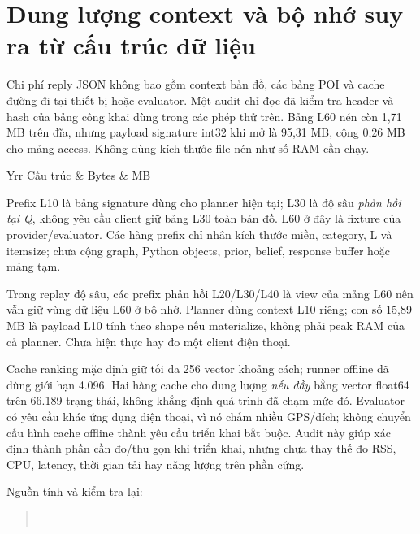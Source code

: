 \section{Dung lượng context và bộ nhớ suy ra từ cấu trúc dữ liệu}
\label{sec:current-resource-footprint}


Chi phí reply JSON không bao gồm context bản đồ, các bảng POI và cache đường
đi tại thiết bị hoặc evaluator. Một audit chỉ đọc đã kiểm tra header và hash
của bảng công khai dùng trong các phép thử trên. Bảng L60 nén còn 1,71 MB
trên đĩa, nhưng payload signature int32 khi mở là 95,31 MB, cộng 0,26 MB
cho mảng access. Không dùng kích thước file nén như số RAM cần chạy.

\begin{table}[htbp]
\centering\small
\caption{Payload mảng công khai và storage suy ra. MB là $10^6$ byte;
không phải peak RAM đã đo.}
\label{tab:current-resource-footprint}
\begin{tabularx}{\textwidth}{Yrr}
\toprule Cấu trúc & Bytes & MB \\\midrule
\EvalResourceRows
\bottomrule
\end{tabularx}
\end{table}

Prefix L10 là bảng signature dùng cho planner hiện tại; L30 là độ sâu
\emph{phản hồi tại Q}, không yêu cầu client giữ bảng L30 toàn bản đồ. L60
ở đây là fixture của provider/evaluator. Các hàng prefix chỉ nhân kích thước
miền, category, L và itemsize; chưa cộng graph, Python objects, prior, belief,
response buffer hoặc mảng tạm.

Trong replay độ sâu, các prefix phản hồi L20/L30/L40 là view của mảng L60
nên vẫn giữ vùng dữ liệu L60 ở bộ nhớ. Planner dùng context L10 riêng;
con số 15,89 MB là payload L10 tính theo shape nếu materialize, không phải
peak RAM của cả planner. Chưa hiện thực hay đo một client điện thoại.

Cache ranking mặc định giữ tối đa 256 vector khoảng cách; runner offline đã
dùng giới hạn 4.096. Hai hàng cache cho dung lượng \emph{nếu đầy} bằng vector
float64 trên 66.189 trạng thái, không khẳng định quá trình đã chạm mức đó.
Evaluator có yêu cầu khác ứng dụng điện thoại, vì nó chấm nhiều GPS/đích;
không chuyển cấu hình cache offline thành yêu cầu triển khai bắt buộc.
Audit này giúp xác định thành phần cần đo/thu gọn khi triển khai, nhưng chưa
thay thế đo RSS, CPU, latency, thời gian tải hay năng lượng trên phần cứng.

Nguồn tính và kiểm tra lại:
\begin{quote}\small
{}\\
\end{quote}
